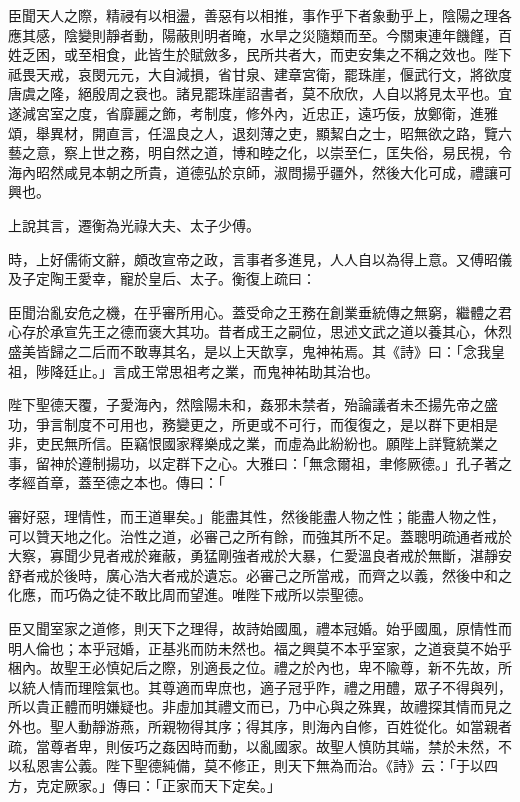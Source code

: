 \begin{pinyinscope}
臣聞天人之際，精祲有以相盪，善惡有以相推，事作乎下者象動乎上，陰陽之理各應其感，陰變則靜者動，陽蔽則明者晻，水旱之災隨類而至。今關東連年饑饉，百姓乏困，或至相食，此皆生於賦斂多，民所共者大，而吏安集之不稱之效也。陛下祗畏天戒，哀閔元元，大自減損，省甘泉、建章宮衛，罷珠崖，偃武行文，將欲度唐虞之隆，絕殷周之衰也。諸見罷珠崖詔書者，莫不欣欣，人自以將見太平也。宜遂減宮室之度，省靡麗之飾，考制度，修外內，近忠正，遠巧佞，放鄭衛，進雅頌，舉異材，開直言，任溫良之人，退刻薄之吏，顯絜白之士，昭無欲之路，覽六藝之意，察上世之務，明自然之道，博和睦之化，以崇至仁，匡失俗，易民視，令海內昭然咸見本朝之所貴，道德弘於京師，淑問揚乎疆外，然後大化可成，禮讓可興也。

上說其言，遷衡為光祿大夫、太子少傅。

時，上好儒術文辭，頗改宣帝之政，言事者多進見，人人自以為得上意。又傅昭儀及子定陶王愛幸，寵於皇后、太子。衡復上疏曰：

臣聞治亂安危之機，在乎審所用心。蓋受命之王務在創業垂統傳之無窮，繼體之君心存於承宣先王之德而褒大其功。昔者成王之嗣位，思述文武之道以養其心，休烈盛美皆歸之二后而不敢專其名，是以上天歆享，鬼神祐焉。其《詩》曰：「念我皇祖，陟降廷止。」言成王常思祖考之業，而鬼神祐助其治也。

陛下聖德天覆，子愛海內，然陰陽未和，姦邪未禁者，殆論議者未丕揚先帝之盛功，爭言制度不可用也，務變更之，所更或不可行，而復復之，是以群下更相是非，吏民無所信。臣竊恨國家釋樂成之業，而虛為此紛紛也。願陛上詳覽統業之事，留神於遵制揚功，以定群下之心。大雅曰：「無念爾祖，聿修厥德。」孔子著之孝經首章，蓋至德之本也。傳曰：「

審好惡，理情性，而王道畢矣。」能盡其性，然後能盡人物之性；能盡人物之性，可以贊天地之化。治性之道，必審己之所有餘，而強其所不足。蓋聰明疏通者戒於大察，寡聞少見者戒於雍蔽，勇猛剛強者戒於大暴，仁愛溫良者戒於無斷，湛靜安舒者戒於後時，廣心浩大者戒於遺忘。必審己之所當戒，而齊之以義，然後中和之化應，而巧偽之徒不敢比周而望進。唯陛下戒所以崇聖德。

臣又聞室家之道修，則天下之理得，故詩始國風，禮本冠婚。始乎國風，原情性而明人倫也；本乎冠婚，正基兆而防未然也。福之興莫不本乎室家，之道衰莫不始乎梱內。故聖王必慎妃后之際，別適長之位。禮之於內也，卑不隃尊，新不先故，所以統人情而理陰氣也。其尊適而卑庶也，適子冠乎阼，禮之用醴，眾子不得與列，所以貴正體而明嫌疑也。非虛加其禮文而已，乃中心與之殊異，故禮探其情而見之外也。聖人動靜游燕，所親物得其序；得其序，則海內自修，百姓從化。如當親者疏，當尊者卑，則佞巧之姦因時而動，以亂國家。故聖人慎防其端，禁於未然，不以私恩害公義。陛下聖德純備，莫不修正，則天下無為而治。《詩》云：「于以四方，克定厥家。」傳曰：「正家而天下定矣。」


\end{pinyinscope}
